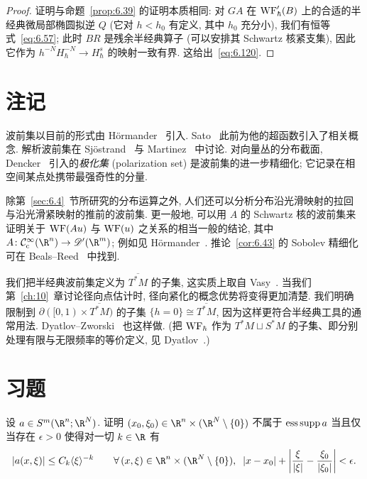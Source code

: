 \begin{proof}
证明与命题~\ref{prop:6.39} 的证明本质相同: 对 $G A$ 在 $\operatorname{WF}'_{\hbar}(B)$ 上的合适的半经典微局部椭圆拟逆 $Q$ (它对 $h < h_0$ 有定义, 其中 $h_0$ 充分小), 我们有恒等式~\eqref{eq:6.57}; 此时 $B R$ 是残余半经典算子 (可以安排其 Schwartz 核紧支集), 因此它作为 $h^{-N}H^{-N}_{\hbar} \to H^s_{\hbar}$ 的映射一致有界. 这给出~\eqref{eq:6.120}.
\end{proof}



\section*{注记}

波前集以目前的形式由 Hörmander~\cite{Hor71a} 引入. Sato~\cite{Sat70} 此前为他的超函数引入了相关概念. 解析波前集在 Sjöstrand~\cite{Sjo82} 与 Martinez~\cite{Mar01} 中讨论. 对向量丛的分布截面, Dencker~\cite{Den82} 引入的\emph{极化集} (polarization set) 是波前集的进一步精细化; 它记录在相空间某点处携带最强奇性的分量.

除第~\ref{sec:6.4}~节所研究的分布运算之外, 人们还可以分析分布沿光滑映射的拉回与沿光滑紧映射的推前的波前集. 更一般地, 可以用 $A$ 的 Schwartz 核的波前集来证明关于 $\operatorname{WF}(A u)$ 与 $\operatorname{WF}(u)$ 之关系的相当一般的结论, 其中 $A \colon \SmoothComp(\R^n) \to \Distr(\R^m)$; 例如见 Hörmander~\cite[§2.5]{Hor71a}. 推论~\ref{cor:6.43} 的 Sobolev 精细化可在 Beals--Reed~\cite{BR84} 中找到.

我们把半经典波前集定义为 $\overline{T^* M}$ 的子集, 这实质上取自 Vasy~\cite[§2.1]{Vas13}. 当我们第~\ref{ch:10}~章讨论径向点估计时, 径向紧化的概念优势将变得更加清楚. 我们明确限制到 $\partial([0,1) \times \overline{T^* M})$ 的子集 $\{h = 0\} \cong \overline{T^* M}$, 因为这样更符合半经典工具的通常用法. Dyatlov--Zworski~\cite{DZ16} 也这样做. (把 $\operatorname{WF}_{\hbar}$ 作为 $T^* M \sqcup S^* M$ 的子集、即分别处理有限与无限频率的等价定义, 见 Dyatlov~\cite{Dya12}.)

\section*{习题}

\begin{exer}[本质支集的等价定义]\label{ex:6.1}
设 $a \in S^m(\R^n; \R^N)$. 证明 $(x_0, \xi_0) \in \R^n \times (\R^N \setminus \{0\})$ 不属于 $\operatorname{ess\,supp} a$ 当且仅当存在 $\epsilon > 0$ 使得对一切 $k \in \R$ 有
\begin{equation}\label{eq:6.121}
    |a(x, \xi)| \le C_k \langle \xi \rangle^{-k} \qquad \forall\, (x, \xi) \in \R^n \times (\R^N \setminus \{0\}), \;\; |x - x_0| + \left| \frac{\xi}{|\xi|} - \frac{\xi_0}{|\xi_0|} \right| < \epsilon.
\end{equation}
\end{exer}

